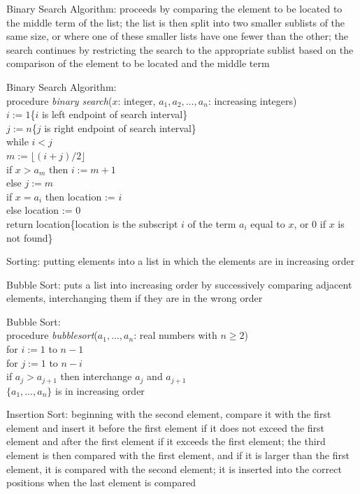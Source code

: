 \documentclass[12pt]{article}
\begin{document}
\begin{definition} Binary Search Algorithm: proceeds by comparing the element to be located to the middle term of the list; the list is then split into two smaller sublists of the same size, or where one of these smaller lists have one fewer than the other; the search continues by restricting the search to the appropriate sublist based on the comparison of the element to be located and the middle term \end{definition} 
\begin{alg} Binary Search Algorithm: \\ 
procedure \textit{binary search}($x$: integer, $a_1, a_2, \dots, a_n$: increasing integers) \\ $i := 1$\{$i$ is left endpoint of search interval\} \\ $j := n$\{$j$ is right endpoint of search interval\} \\ while $i < j$ \\ \indent $m := \lfloor (i + j)/2 \rfloor$ \\ \indent if $x > a_m$ then $i := m + 1$ \\ \indent else $j := m$ \\ if $x = a_i$ then location := $i$ \\ else location := 0 \\ return location\{location is the subscript $i$ of the term $a_i$ equal to $x$, or 0 if $x$ is not found\} \end{alg}
\begin{definition} Sorting: putting elements into a list in which the elements are in increasing order \end{definition} 
\begin{definition} Bubble Sort: puts a list into increasing order by successively comparing adjacent elements, interchanging them if they are in the wrong order \end{definition} 
\begin{alg} Bubble Sort: \\ procedure \textit{bubblesort}($a_1,\dots, a_n$: real numbers with $n \geq 2$) \\ for $i := 1$ to $n - 1$ \\ \indent for $j := 1$ to $n - i$ \\ \indent \indent if $a_j > a_{j + 1}$ then interchange $a_j$ and $a_{j + 1}$ \\ $\{a_1, \dots, a_n\}$ is in increasing order \end{alg}
\begin{definition} Insertion Sort: beginning with the second element, compare it with the first element and insert it before the first element if it does not exceed the first element and after the first element if it exceeds the first element; the third element is then compared with the first element, and if it is larger than the first element, it is compared with the second element; it is inserted into the correct positions when the last element is compared \end{definition} 
\end{document}
